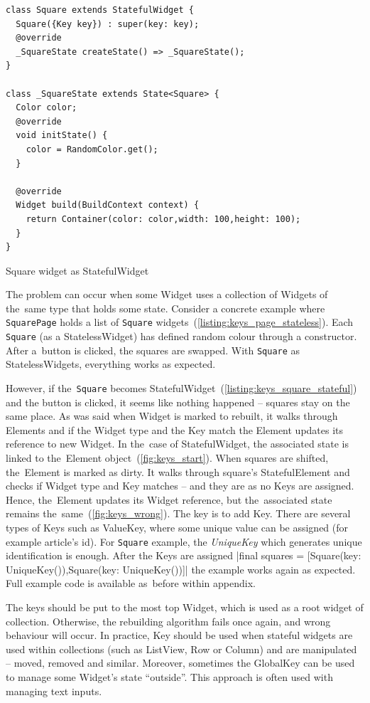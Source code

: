 \begin{listing}[ht]
\begin{verbatim}
class Square extends StatefulWidget {
  Square({Key key}) : super(key: key);
  @override
  _SquareState createState() => _SquareState();
}

class _SquareState extends State<Square> {
  Color color;
  @override
  void initState() {
    color = RandomColor.get();
  }

  @override
  Widget build(BuildContext context) {
    return Container(color: color,width: 100,height: 100);
  }
}
\end{verbatim}
\caption{Square widget as StatefulWidget}
\label{listing:keys_square_stateful}
\end{listing}

The problem can occur when some Widget uses a collection of Widgets of the~same type that holds some state.  Consider a concrete example where \verb|SquarePage| holds a list of \verb|Square| widgets~(\cref{listing:keys_page_stateless}). Each \verb|Square| (as a StatelessWidget) has defined random colour through a constructor. After a~button is clicked, the squares are swapped. With \verb|Square| as StatelessWidgets, everything works as expected. 

However, if the~\verb|Square| becomes StatefulWidget~(\cref{listing:keys_square_stateful}) and the button is clicked, it seems like nothing happened -- squares stay on the same place. As was said when Widget is marked to rebuilt, it walks through Elements and if the Widget type and the Key match the Element updates its reference to new Widget. In the~case of StatefulWidget, the associated state is linked to the~Element object~(\cref{fig:keys_start}). When squares are shifted, the~Element is marked as dirty. It walks through square's StatefulElement and checks if Widget type and Key matches -- and they are as no Keys are assigned. Hence, the~Element updates its Widget reference, but the~associated state remains the~same~(\cref{fig:keys_wrong}). 
The key is to add Key. There are several types of Keys such as ValueKey, where some unique value can be assigned (for example article's id). For \verb|Square| example, the \textit{UniqueKey} which generates unique identification is enough.  After the Keys are assigned |final squares = [Square(key: UniqueKey()),Square(key: UniqueKey())]| the example works again as expected. Full example code is available as~before within appendix.

The keys should be put to the most top Widget, which is used as a root widget of collection. Otherwise, the rebuilding algorithm fails once again, and wrong behaviour will occur. In practice, Key should be used when stateful widgets are used within collections (such as ListView, Row or Column) and are manipulated -- moved, removed and similar.  Moreover, sometimes the GlobalKey can be used to manage some Widget's state ``outside''. This approach is often used with managing text inputs. 
